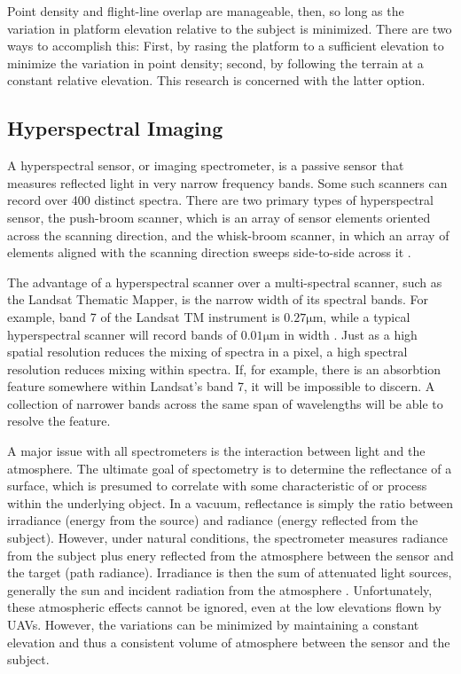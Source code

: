 \documentclass[10pt]{report}
\begin{document}
Point density and flight-line overlap are manageable, then, so long as the variation in platform elevation relative to the subject is minimized. There are two ways to accomplish this: First, by rasing the platform to a sufficient elevation to minimize the variation in point density; second, by following the terrain at a constant relative elevation. This research is concerned with the latter option.

\subsection{Hyperspectral Imaging}

A hyperspectral sensor, or imaging spectrometer, is a passive sensor that measures reflected light in very narrow frequency bands. Some such scanners can record over 400 distinct spectra. There are two primary types of hyperspectral sensor, the push-broom scanner, which is an array of sensor elements oriented across the scanning direction, and the whisk-broom scanner, in which an array of elements aligned with the scanning direction sweeps side-to-side across it \cite{Lillesand1999}.

The advantage of a hyperspectral scanner over a multi-spectral scanner, such as the Landsat Thematic Mapper, is the narrow width of its spectral bands. For example, band 7 of the Landsat TM instrument is $0.27\si{\um}$, while a typical hyperspectral scanner will record bands of $0.01\si{\um}$ in width \cite{Lillesand1999}. Just as a high spatial resolution reduces the mixing of spectra in a pixel, a high spectral resolution reduces mixing within spectra. If, for example, there is an absorbtion feature somewhere within Landsat's band 7, it will be impossible to discern. A collection of narrower  bands across the same span of wavelengths will be able to resolve the feature.

A major issue with all spectrometers is the interaction between light and the atmosphere. The ultimate goal of spectometry is to determine the reflectance of a surface, which is presumed to correlate with some characteristic of or process within the underlying object. In a vacuum, reflectance is simply the ratio between irradiance (energy from the source) and radiance (energy reflected from the subject). However, under natural conditions, the spectrometer measures radiance from the subject plus enery reflected from the atmosphere between the sensor and the target (path radiance). Irradiance is then the sum of attenuated light sources, generally the sun and incident radiation from the atmosphere \cite{Lillesand1999}. Unfortunately, these atmospheric effects cannot be ignored, even at the low elevations flown by UAVs. However, the variations can be minimized by maintaining a constant elevation and thus a consistent volume of atmosphere between the sensor and the subject.
\end{document}
